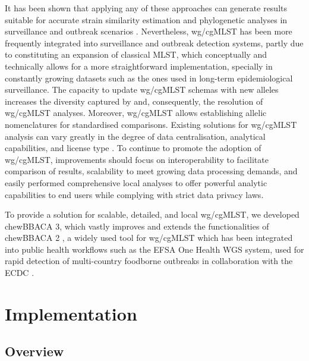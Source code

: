 It has been shown that applying any of these approaches can generate results suitable for accurate strain similarity estimation and phylogenetic analyses in surveillance and outbreak scenarios \citep{uelze_typing_2020, bush_genomic_2020, valiente-mullor_one_2021, ndiaye_when_2024, belbasi_minimizer_2022, king_comparison_2024}. Nevertheless, \ac{wg/cgMLST} has been more frequently integrated into surveillance and outbreak detection systems, partly due to constituting an expansion of classical \ac{MLST}, which conceptually and technically allows for a more straightforward implementation, specially in constantly growing datasets such as the ones used in long-term epidemiological surveillance. The capacity to update \ac{wg/cgMLST} schemas with new alleles increases the diversity captured by and, consequently, the resolution of \ac{wg/cgMLST} analyses. Moreover, \ac{wg/cgMLST} allows establishing allelic nomenclatures for standardised comparisons. Existing solutions for \ac{wg/cgMLST} analysis can vary greatly in the degree of data centralisation, analytical capabilities, and license type \citep{jolley_bigsdb_2010, zhou_enterobase_2020, mamede_chewie_2021}. To continue to promote the adoption of \ac{wg/cgMLST}, improvements should focus on interoperability to facilitate comparison of results, scalability to meet growing data processing demands, and easily performed comprehensive local analyses to offer powerful analytic capabilities to end users while complying with strict data privacy laws.

To provide a solution for scalable, detailed, and local \ac{wg/cgMLST}, we developed chewBBACA 3, which vastly improves and extends the functionalities of chewBBACA 2 \citep{mamede_chewie_2021, silva_chewbbaca_2018}, a widely used tool for \ac{wg/cgMLST} which has been integrated into public health workflows such as the \ac{EFSA} One Health \ac{WGS} system, used for rapid detection of multi-country foodborne outbreaks in collaboration with the \ac{ECDC} \citep{authority_efsa_guidelines_2022}.

\section{Implementation} \label{sec:implementation}

\subsection{Overview} \label{ssec:overview}

